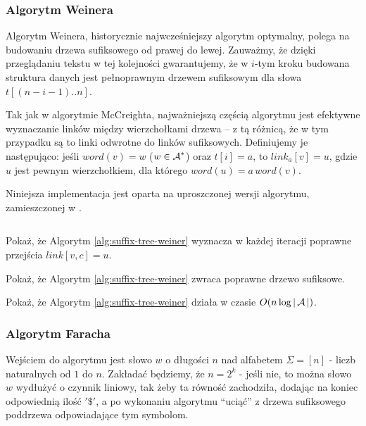 \subsubsection{Algorytm Weinera}

Algorytm Weinera, historycznie najwcześniejszy algorytm optymalny, polega na budowaniu drzewa sufiksowego od prawej do lewej. Zauważmy, że dzięki przeglądaniu tekstu w tej kolejności gwarantujemy, że w $i$-tym kroku budowana struktura danych jest pełnoprawnym drzewem sufiksowym dla słowa $t[(n - i - 1)..n]$.

Tak jak w algorytmie McCreighta, najważniejszą częścią algorytmu jest efektywne wyznaczanie linków między wierzchołkami drzewa -- z tą różnicą, że w tym przypadku są to linki odwrotne do linków sufiksowych.
Definiujemy je następująco: jeśli $word(v) = w$ ($w \in \operatorname{\mathcal{A}}^*$) oraz $t[i] = a$, to $link_a[v] = u$, gdzie $u$ jest pewnym wierzchołkiem, dla którego $word(u) = a \, word(v)$.

Niniejsza implementacja jest oparta na uproszczonej wersji algorytmu, zamieszczonej w \citet{breslauer2013near}.
\begin{code}
\inputminted{python}{code/suffix-tree/weiner.py}
\label{alg:suffix-tree-weiner}
\end{code}

\begin{problem}{}{}
  Pokaż, że Algorytm \ref{alg:suffix-tree-weiner} wyznacza w każdej iteracji poprawne przejścia $link[v, c] = u$.
\end{problem}

\begin{problem}{}{}
  Pokaż, że Algorytm \ref{alg:suffix-tree-weiner} zwraca poprawne drzewo sufiksowe.
\end{problem}

\begin{problem}{}{}
  Pokaż, że Algorytm \ref{alg:suffix-tree-weiner} działa w czasie $O(n \log{|\operatorname{\mathcal{A}}|})$.
\end{problem}

\subsubsection{Algorytm Faracha}
    Wejściem do algorytmu jest słowo $w$ o długości $n$ nad alfabetem $\Sigma = [n]$ - liczb naturalnych od $1$ do $n$. Zakładać będziemy, że $n = 2^k$ - jeśli nie, to można słowo $w$ wydłużyć o czynnik liniowy, tak żeby ta równość zachodziła, dodając na koniec odpowiednią ilość $'\$'$, a po wykonaniu algorytmu ``uciąć'' z drzewa sufiksowego poddrzewa odpowiadające tym symbolom.
    
